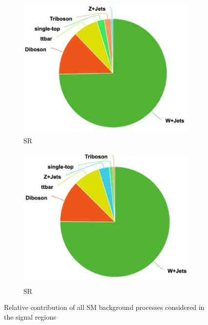\begin{figure}[h]
  \centering
     \begin{subfigure}{0.49\textwidth}
     \includegraphics[width = 0.98\textwidth]{figures/4/background_yield_breakdown_merged_SR.pdf}
    \caption{\merged SR}
    \label{fig:background_yield_breakdown_merged_SR}
     \end{subfigure}
    \begin{subfigure}{0.49\textwidth}
     \includegraphics[width = 0.98\textwidth]{figures/4/background_yield_breakdown_resolved_SR.pdf}
     \caption{\resolved SR}
     \label{fig:background_yield_breakdown_resolved_SR}
     \end{subfigure}
     \caption{Relative contribution of all SM background processes considered in the signal regions}
     \label{fig:background_yield_breakdown}
  \end{figure}


